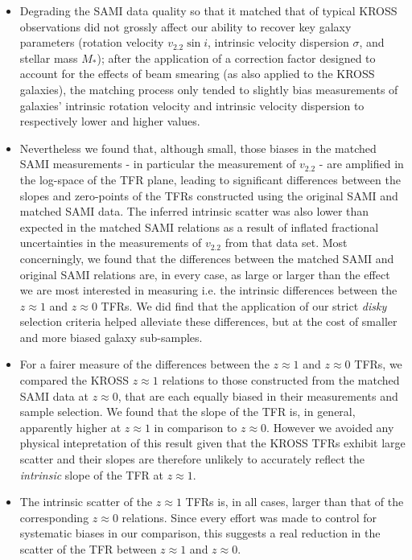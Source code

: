 \documentclass[a4paper,fleqn,usenatbib]{mnras}
\begin{document}
{\begin{itemize}
\item \noindent Degrading the SAMI data quality so that it matched that of typical KROSS observations did not grossly affect our ability to recover key galaxy parameters (rotation velocity $v_{2.2}\sin i$, intrinsic velocity dispersion $\sigma$, and stellar mass $M_{*}$); after the application of a correction factor \citep{Johnson:2018} designed to account for the effects of beam smearing (as also applied to the KROSS galaxies), the matching process only tended to slightly bias measurements of galaxies' intrinsic rotation velocity and intrinsic velocity dispersion to respectively lower and higher values. 
\newline 
\item \noindent Nevertheless we found that, although small, those biases in the matched SAMI measurements - in particular the measurement of $v_{2.2}$ - are amplified in the log-space of the TFR plane, leading to significant differences between the slopes and zero-points of the TFRs constructed using the original SAMI and matched SAMI data. The inferred intrinsic scatter was also lower than expected in the matched SAMI relations as a result of inflated fractional uncertainties in the measurements of $v_{2.2}$ from that data set. Most concerningly, we found that the differences between the matched SAMI and original SAMI relations are, in every case, as large or larger than the effect we are most interested in measuring i.e. the intrinsic differences between the $z\approx1$ and $z\approx0$ TFRs. We did find that the application of our strict {\it disky} selection criteria helped alleviate these differences, but at the cost of smaller and more biased galaxy sub-samples.
\newline
\item \noindent For a fairer measure of the differences between the $z\approx1$ and $z\approx0$ TFRs, we compared the KROSS $z\approx1$ relations to those constructed from the matched SAMI data at $z\approx0$, that are each equally biased in their measurements and sample selection. We found that the slope of the TFR is, in general, apparently higher at $z \approx 1$ in comparison to $z \approx 0$. However we avoided any physical intepretation of this result given that the KROSS TFRs exhibit large scatter and their slopes are therefore unlikely to accurately reflect the {\it intrinsic} slope of the TFR at $z\approx1$.
\newline
\item \noindent The intrinsic scatter of the $z \approx 1$ TFRs is, in all cases, larger than that of the corresponding $z \approx 0$ relations. Since every effort was made to control for systematic biases in our comparison, this suggests a real reduction in the scatter of the TFR between $z\approx1$ and $z\approx0$.

\end{itemize}}
\end{document}
